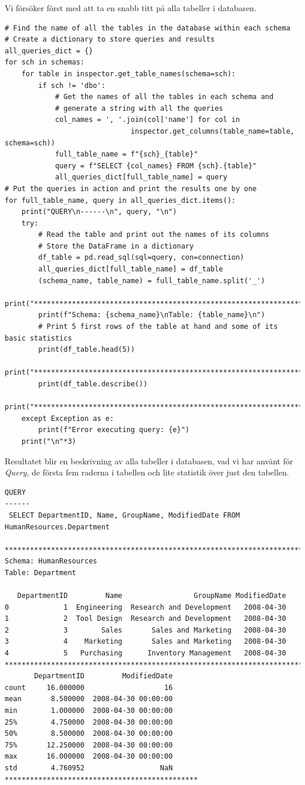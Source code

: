 \documentclass[]{article}
\begin{document}
Vi försöker först med att ta en snabb titt på alla tabeller i databasen.
\begin{lstlisting}
# Find the name of all the tables in the database within each schema
# Create a dictionary to store queries and results
all_queries_dict = {}
for sch in schemas:
    for table in inspector.get_table_names(schema=sch):
        if sch != 'dbo':
            # Get the names of all the tables in each schema and
            # generate a string with all the queries
            col_names = ', '.join(col['name'] for col in 
            			      inspector.get_columns(table_name=table, schema=sch))
            full_table_name = f"{sch}_{table}"
            query = f"SELECT {col_names} FROM {sch}.{table}"
            all_queries_dict[full_table_name] = query
# Put the queries in action and print the results one by one
for full_table_name, query in all_queries_dict.items():
    print("QUERY\n------\n", query, "\n")
    try:
        # Read the table and print out the names of its columns
        # Store the DataFrame in a dictionary
        df_table = pd.read_sql(sql=query, con=connection)
        all_queries_dict[full_table_name] = df_table
        (schema_name, table_name) = full_table_name.split('_')
        print("******************************************************************")
        print(f"Schema: {schema_name}\nTable: {table_name}\n")
        # Print 5 first rows of the table at hand and some of its basic statistics
        print(df_table.head(5))
        print("******************************************************************")
        print(df_table.describe())
        print("******************************************************************")
    except Exception as e:
        print(f"Error executing query: {e}")
    print("\n"*3)
\end{lstlisting}
Resultatet blir en beskrivning av alla tabeller i databasen, vad vi har använt för \emph{Query}, de första fem raderna i tabellen och lite statistik över just den tabellen.
\begin{lstlisting}
QUERY
------
 SELECT DepartmentID, Name, GroupName, ModifiedDate FROM HumanResources.Department 

*************************************************************************
Schema: HumanResources
Table: Department

   DepartmentID         Name                 GroupName ModifiedDate
0             1  Engineering  Research and Development   2008-04-30
1             2  Tool Design  Research and Development   2008-04-30
2             3        Sales       Sales and Marketing   2008-04-30
3             4    Marketing       Sales and Marketing   2008-04-30
4             5   Purchasing      Inventory Management   2008-04-30
*************************************************************************
       DepartmentID         ModifiedDate
count     16.000000                   16
mean       8.500000  2008-04-30 00:00:00
min        1.000000  2008-04-30 00:00:00
25%        4.750000  2008-04-30 00:00:00
50%        8.500000  2008-04-30 00:00:00
75%       12.250000  2008-04-30 00:00:00
max       16.000000  2008-04-30 00:00:00
std        4.760952                  NaN
**********************************************
\end{lstlisting}
\end{document}
